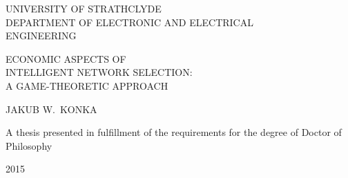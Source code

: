 \begin{titlepage}

{\centering

{\sffamily\Large UNIVERSITY OF STRATHCLYDE}\\
{\sffamily\Large DEPARTMENT OF ELECTRONIC AND ELECTRICAL}\\
{\sffamily\Large ENGINEERING}

\vspace*{3cm}

{\sffamily\Huge ECONOMIC ASPECTS OF}\\
{\sffamily\Huge INTELLIGENT NETWORK SELECTION:}\\
{\sffamily\Huge A GAME-THEORETIC APPROACH}

\vspace{8cm}

{\sffamily\LARGE JAKUB W.~KONKA}

\par
\vspace{3cm}

{\sffamily\Large A thesis presented in fulfillment of the requirements for the degree of Doctor of Philosophy}

\par
\vspace{1cm}

{\sffamily\Large 2015}

}

\end{titlepage}
